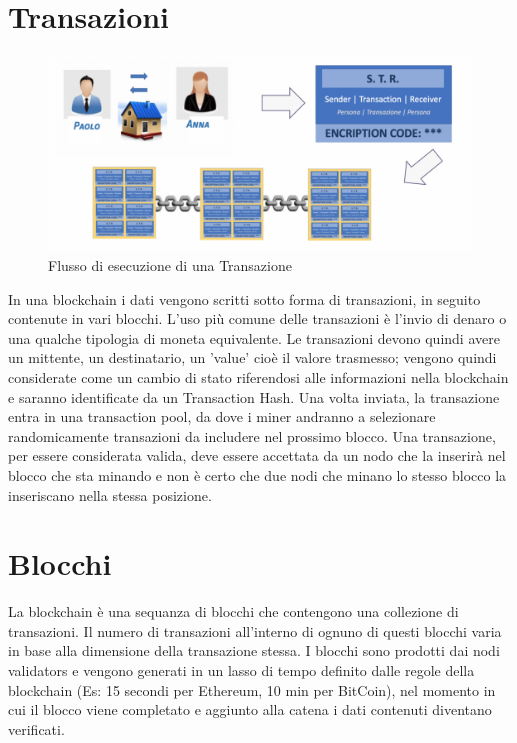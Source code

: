 \documentclass[11pt,a4paper,titlepage]{report}
\begin{document}
\section{Transazioni}
\begin{figure}[h]
	\includegraphics[width=\textwidth]{flusso_bc}
	\centering
	\caption{Flusso di esecuzione di una Transazione}
	\label{fig:fl_bc}
\end{figure}
In una blockchain i dati vengono scritti sotto forma di transazioni, in seguito contenute in vari blocchi. L'uso più comune delle transazioni è l'invio di denaro o una qualche tipologia di moneta equivalente. Le transazioni devono quindi avere un mittente, un destinatario, un 'value' cioè il valore trasmesso; vengono quindi considerate come un cambio di stato riferendosi alle informazioni nella blockchain e saranno identificate da un Transaction Hash. Una volta inviata, la transazione entra in una transaction pool, da dove i miner andranno a selezionare randomicamente transazioni da includere nel prossimo blocco. Una transazione, per essere considerata valida, deve essere accettata da un nodo che la inserirà nel blocco che sta minando e non è certo che due nodi che minano lo stesso blocco la inseriscano nella stessa posizione.

\section{Blocchi}
La blockchain è una sequanza di blocchi che contengono una collezione di transazioni. Il numero di transazioni all'interno di ognuno di questi blocchi varia in base alla dimensione della transazione stessa. I blocchi sono prodotti dai nodi validators e vengono generati in un lasso di tempo definito dalle regole della blockchain (Es: 15 secondi per Ethereum, 10 min per BitCoin), nel momento in cui il blocco viene completato e aggiunto alla catena i dati contenuti diventano verificati.
\end{document}
